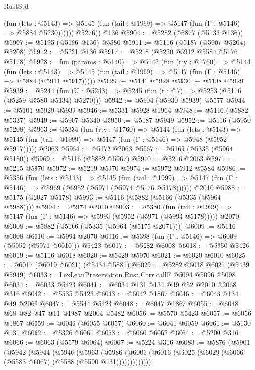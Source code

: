 \begin{lexlean}{RustStd}
\begin{coremodule}
{\begin{coremodule}
{{{{{{{{{{{{{{{{{{{{{{{{{{{{{{{              (fun (lets : @5143) =>
              @5145 (fun (tail : @1999) => @5147 (fun (Γ : @5146) => @5884 @5230))))))
        @5276))
    @136
@5904 := @5282 (@5877 (@5133 @136))
@5907 := @5195 (@5196 @136) @5580
@5911 := @5116 (@5187 (@5907 @5204) @5208)
@5912 := @5221 @136
@5917 := @5218 (@5220 @5912 @5584 @5176 @5178)
@5928 := fun (params : @5140) =>
  @5142
    (fun (rty : @1760) =>
    @5144
      (fun (lets : @5143) =>
      @5145 (fun (tail : @1999) => @5147 (fun (Γ : @5146) => @5884 (@5911 @5917)))))
@5929 := @5141 @5928
@5930 := @5138 @5929
@5939 := @5244 (fun (U : @5243) => @5245 (fun (t : @7) => @5253 (@5116 (@5259 @5580 @5134) @5270)))
@5942 := @5904 (@5930 @5939) @5577
@5944 := @5101 @5929 @5939
@5946 := @5331 @5928 @1964
@5948 := @5116 (@5882 @5337)
@5949 := @5907 @5340
@5950 := @5187 @5949
@5952 := @5116 (@5950 @5208)
@5963 := @5334
    (fun (rty : @1760) =>
    @5144
      (fun (lets : @5143) =>
      @5145 (fun (tail : @1999) => @5147 (fun (Γ : @5146) => @5948 (@5952 @5917)))))
    @2063
@5964 := @5172 @2063
@5967 := @5166 (@5335 (@5964 @5180))
@5969 := @5116 (@5882 @5967)
@5970 := @5216 @2063
@5971 := @5215 @5970
@5972 := @5219 @5970
@5974 := @5972 @5912 @5584
@5986 := @5356
    (fun (lets : @5143) =>
    @5145
      (fun (tail : @1999) => @5147 (fun (Γ : @5146) => @5969 (@5952 (@5971 (@5974 @5176 @5178))))))
    @2010
@5988 := @5175 (@2027 @5178)
@5993 := @5116 (@5882 (@5166 (@5335 (@5964 @5988))))
@5994 := @5974 @2010
@6003 := @5380
    (fun (tail : @1999) => @5147 (fun (Γ : @5146) => @5993 (@5952 (@5971 (@5994 @5178)))))
    @2070
@6008 := @5882 (@5166 (@5335 (@5964 (@5175 @2071))))
@6009 := @5116 @6008
@6010 := @5994 @2070
@6016 := @5398 (fun (Γ : @5146) => @6009 (@5952 (@5971 @6010))) @5423
@6017 := @5282 @6008
@6018 := @5950 @5426
@6019 := @5116 @6018
@6020 := @5429 @5970
@6021 := @6020 @6010
@6025 := @6017 (@6019 @6021) (@5434 @5881)
@6029 := @5282 @6018 @6021 (@5439 @5949)
@6033 := LexLeanPreservation.Rust.Corr.callF @5094 @5096 @5098
@6034 := @6033 @5423
@6041 := @6034 @131 @134 @49 @52 @2010 @2068 @316
@6042 := @5535 @5423
@6043 := @6042 @1867
@6046 := @6043 @134 @49 @2068
@6047 := @5544 @5423
@6048 := @6047 @1867
@6055 := @6048 @68 @82 @47 @11 @1987 @2004 @5482
@6056 := @5570 @5423
@6057 := @6056 @1867
@6059 := @6046 (@6055 @6057)
@6060 := @6041 @6059
@6061 := @5130 @131
@6062 := @5326 @6061
@6063 := @6060 @6062
@6064 := @5200 @316
@6066 := @6063 (@5579 @6064)
@6067 := @5224 @316
@6083 := @5876
    (@5901
      (@5942
        (@5944
          (@5946
            (@5963
              (@5986
                (@6003 (@6016 (@6025 (@6029 (@6066 (@5583 @6067) (@5588 (@5590 @131)))))))))))))
}}}}}}}}}}}}}}}}}}}}}}}}}}}}}}}
\end{coremodule}}
\end{coremodule}
\end{lexlean}
